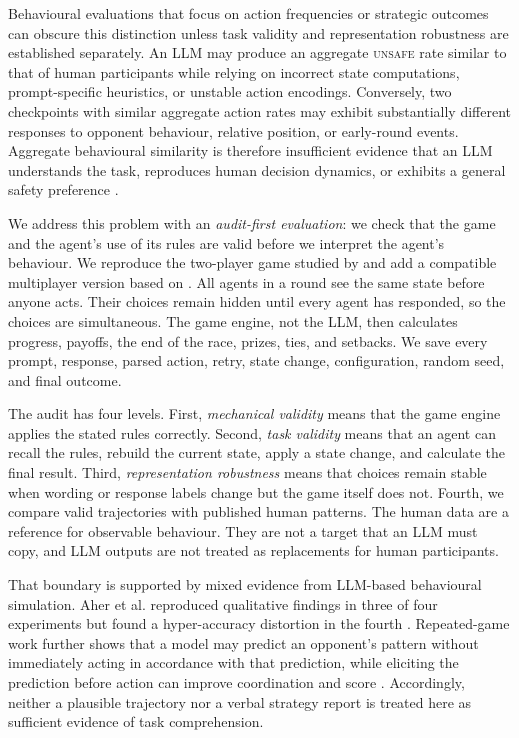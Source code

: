 \documentclass[sigconf]{aamas}
\newcommand{\Unsafe}{\textsc{unsafe}}
\begin{document}
Behavioural evaluations that focus on action frequencies or strategic
outcomes can obscure this distinction unless task validity and
representation robustness are established separately. An LLM may produce
an aggregate \Unsafe{} rate similar to that of human participants while
relying on incorrect state computations, prompt-specific heuristics, or
unstable action encodings. Conversely, two checkpoints with similar
aggregate action rates may exhibit substantially different responses to
opponent behaviour, relative position, or early-round events. Aggregate
behavioural similarity is therefore insufficient evidence that an LLM
understands the task, reproduces human decision dynamics, or exhibits a
general safety preference \citep{synthetic_replacement_human}.

We address this problem with an \emph{audit-first evaluation}: we check that
the game and the agent's use of its rules are valid before we interpret the
agent's behaviour. We reproduce the two-player game studied by
\citet{falling_behind_unsafe} and add a compatible multiplayer version based
on \citet{to_regulate_or_not}. All agents in a round see the same state before
anyone acts. Their choices remain hidden until every agent has responded, so
the choices are simultaneous. The game engine, not the LLM, then calculates
progress, payoffs, the end of the race, prizes, ties, and setbacks. We save
every prompt, response, parsed action, retry, state change, configuration,
random seed, and final outcome.

The audit has four levels. First, \emph{mechanical validity} means that the
game engine applies the stated rules correctly. Second, \emph{task validity}
means that an agent can recall the rules, rebuild the current state, apply a
state change, and calculate the final result. Third, \emph{representation
robustness} means that choices remain stable when wording or response labels
change but the game itself does not. Fourth, we compare valid trajectories
with published human patterns. The human data are a reference for observable
behaviour. They are not a target that an LLM must copy, and LLM outputs are
not treated as replacements for human participants.

That boundary is supported by mixed evidence from LLM-based behavioural
simulation. Aher et al. reproduced qualitative findings in three of four
experiments but found a hyper-accuracy distortion in the fourth
\citep{using_llm_to_simulate}. Repeated-game work further shows that a model
may predict an opponent's pattern without immediately acting in accordance
with that prediction, while eliciting the prediction before action can
improve coordination and score \citep{playing_repeated_games_with_llms}.
Accordingly, neither a plausible trajectory nor a verbal strategy report is
treated here as sufficient evidence of task comprehension.
\end{document}
